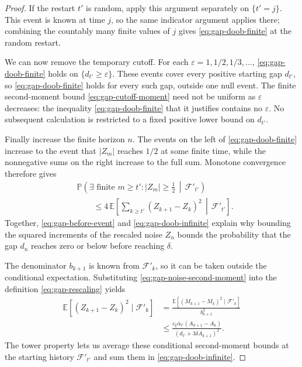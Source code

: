 \begin{proof}
If the restart $t'$ is random, apply this argument separately on $\{t'=j\}$. This event is known at time $j$, so the same indicator argument applies there; combining the countably many finite values of $j$ gives \eqref{eq:gap-doob-finite} at the random restart.

We can now remove the temporary cutoff. For each $\varepsilon=1,1/2,1/3,\ldots$, \eqref{eq:gap-doob-finite} holds on $\{d_{t'}\ge\varepsilon\}$. These events cover every positive starting gap $d_{t'}$, so \eqref{eq:gap-doob-finite} holds for every such gap, outside one null event. The finite second-moment bound \eqref{eq:gap-cutoff-moment} need not be uniform as $\varepsilon$ decreases: the inequality \eqref{eq:gap-doob-finite} that it justifies contains no $\varepsilon$. No subsequent calculation is restricted to a fixed positive lower bound on $d_{t'}$.

Finally increase the finite horizon $n$. The events on the left of \eqref{eq:gap-doob-finite} increase to the event that $|Z_m|$ reaches $1/2$ at some finite time, while the nonnegative sums on the right increase to the full sum. Monotone convergence therefore gives
\begin{equation}
\begin{aligned}
&\mathbb P\!\left(\exists\text{ finite }m\ge t':|Z_m|\ge\tfrac12
\,\middle|\,\mathcal F'_{t'}\right)\\
&\qquad\le
4\,\mathbb E\!\left[
\sum_{k\ge t'}(Z_{k+1}-Z_k)^2
\,\middle|\,\mathcal F'_{t'}\right].
\end{aligned}
\label{eq:gap-doob-infinite}
\end{equation}
Together, \eqref{eq:gap-before-event} and \eqref{eq:gap-doob-infinite} explain why bounding the squared increments of the rescaled noise $Z_n$ bounds the probability that the gap $d_n$ reaches zero or below before reaching $\delta$.

The denominator $b_{k+1}$ is known from $\mathcal F'_k$, so it can be taken outside the conditional expectation. Substituting \eqref{eq:gap-noise-second-moment} into the definition \eqref{eq:gap-rescaling} yields
\begin{equation}
\begin{aligned}
\mathbb E[(Z_{k+1}-Z_k)^2\mid\mathcal F'_k]
&=\frac{\mathbb E[(M_{k+1}-M_k)^2\mid\mathcal F'_k]}{b_{k+1}^2}\\
&\le
\frac{c_\xi\bar\alpha_{t'}(A_{k+1}-A_k)}
{(d_{t'}+3\delta A_{k+1})^2}.
\end{aligned}
\label{eq:gap-rescaled-moment}
\end{equation}
The tower property lets us average these conditional second-moment bounds at the starting history $\mathcal F'_{t'}$ and sum them in \eqref{eq:gap-doob-infinite}.


\end{proof}
